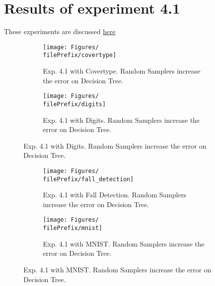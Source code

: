 
\newcommand{\major}{4}
\newcommand{\minor}{1}

\newcommand{\undPrefix}{\major_\minor}
\newcommand{\dotPrefix}{\major.\minor}
\newcommand{\scoPrefix}{\major-\minor}
\newcommand{\filePrefix}{\undPrefix}

\chapter{Results of experiment \dotPrefix} %


\label{Appendix\scoPrefix} %

These experiments are discussed \hyperref[disc:h4]{here}
\begin{figure}[ht]
  \centering
  \begin{subfigure}[t]{0.5\linewidth}
    \centering\captionsetup{width=.8\linewidth}\texttt{[image: Figures/\\filePrefix/covertype]}
    \caption{Exp. 4.1 with Covertype. Random Samplers increase the error on Decision Tree.}
    \label{fig:\undPrefix_covertype}
  \end{subfigure}%
  \begin{subfigure}[t]{0.5\linewidth}
    \centering\captionsetup{width=.8\linewidth}\texttt{[image: Figures/\\filePrefix/digits]}
    \caption{Exp. 4.1 with Digits. Random Samplers increase the error on Decision Tree.}
    \label{fig:\undPrefix_digits}
  \end{subfigure}
\end{figure}


\begin{figure}[ht]
  \centering
  \begin{subfigure}[t]{0.5\linewidth}
    \centering\captionsetup{width=.8\linewidth}\texttt{[image: Figures/\\filePrefix/fall\_detection]}
    \caption{Exp. 4.1 with Fall Detection. Random Samplers increase the error on Decision Tree.}
    \label{fig:\undPrefix_fall_detection}
  \end{subfigure}%
  \begin{subfigure}[t]{0.5\linewidth}
    \centering\captionsetup{width=.8\linewidth}\texttt{[image: Figures/\\filePrefix/mnist]}
    \caption{Exp. 4.1 with MNIST. Random Samplers increase the error on Decision Tree.}
    \label{fig:\undPrefix_mnist}
  \end{subfigure}
\end{figure}


